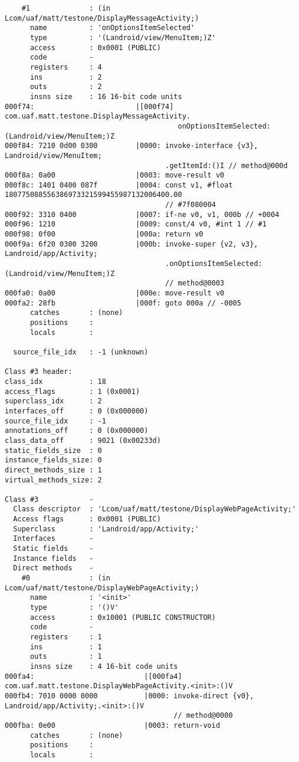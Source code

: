 \begin{lstlisting}
    #1              : (in Lcom/uaf/matt/testone/DisplayMessageActivity;)
      name          : 'onOptionsItemSelected'
      type          : '(Landroid/view/MenuItem;)Z'
      access        : 0x0001 (PUBLIC)
      code          -
      registers     : 4
      ins           : 2
      outs          : 2
      insns size    : 16 16-bit code units
000f74:                        |[000f74] com.uaf.matt.testone.DisplayMessageActivity.
                                         onOptionsItemSelected:(Landroid/view/MenuItem;)Z
000f84: 7210 0d00 0300         |0000: invoke-interface {v3}, Landroid/view/MenuItem;
                                      .getItemId:()I // method@000d
000f8a: 0a00                   |0003: move-result v0
000f8c: 1401 0400 087f         |0004: const v1, #float 180775088556386973321599455987132006400.00
                                      // #7f080004
000f92: 3310 0400              |0007: if-ne v0, v1, 000b // +0004
000f96: 1210                   |0009: const/4 v0, #int 1 // #1
000f98: 0f00                   |000a: return v0
000f9a: 6f20 0300 3200         |000b: invoke-super {v2, v3}, Landroid/app/Activity;
                                      .onOptionsItemSelected:(Landroid/view/MenuItem;)Z
                                      // method@0003
000fa0: 0a00                   |000e: move-result v0
000fa2: 28fb                   |000f: goto 000a // -0005
      catches       : (none)
      positions     :
      locals        :

  source_file_idx   : -1 (unknown)

Class #3 header:
class_idx           : 18
access_flags        : 1 (0x0001)
superclass_idx      : 2
interfaces_off      : 0 (0x000000)
source_file_idx     : -1
annotations_off     : 0 (0x000000)
class_data_off      : 9021 (0x00233d)
static_fields_size  : 0
instance_fields_size: 0
direct_methods_size : 1
virtual_methods_size: 2

Class #3            -
  Class descriptor  : 'Lcom/uaf/matt/testone/DisplayWebPageActivity;'
  Access flags      : 0x0001 (PUBLIC)
  Superclass        : 'Landroid/app/Activity;'
  Interfaces        -
  Static fields     -
  Instance fields   -
  Direct methods    -
    #0              : (in Lcom/uaf/matt/testone/DisplayWebPageActivity;)
      name          : '<init>'
      type          : '()V'
      access        : 0x10001 (PUBLIC CONSTRUCTOR)
      code          -
      registers     : 1
      ins           : 1
      outs          : 1
      insns size    : 4 16-bit code units
000fa4:                          |[000fa4] com.uaf.matt.testone.DisplayWebPageActivity.<init>:()V
000fb4: 7010 0000 0000           |0000: invoke-direct {v0}, Landroid/app/Activity;.<init>:()V
                                        // method@0000
000fba: 0e00                     |0003: return-void
      catches       : (none)
      positions     :
      locals        :


\end{lstlisting}
